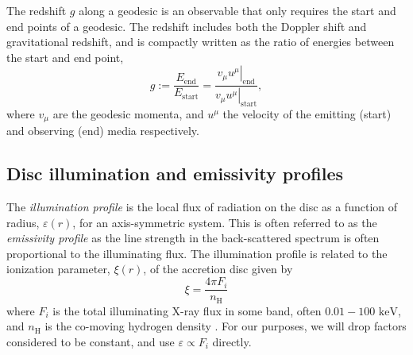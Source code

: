 \documentclass[fleqn,usenatbib]{mnras}
\begin{document}
The redshift $g$ along a geodesic is an observable that only requires the start
and end points of a geodesic. The redshift includes both the Doppler shift and
gravitational redshift, and is compactly written as the ratio of energies
between the start and end point,
\begin{equation}
\label{eq:redshift}
g := \frac{E_\text{end}}{E_\text{start}} = \frac{\left. v_\mu u^\mu
\right\rvert_\text{end}}{\left. v_\mu u^\mu \right\rvert_{\text{start}}},
\end{equation}
where $v_\mu$ are the geodesic momenta, and $u^\mu$ the velocity of the emitting
(start) and observing (end) media respectively.



\subsection{Disc illumination and emissivity profiles}
\label{sec:emissivity-profiles}

The \emph{illumination profile} is the local flux of radiation on the disc as a function of radius, $\varepsilon(r)$, for an axis-symmetric system. This is often referred to as the \emph{emissivity profile} as the line strength in the back-scattered spectrum is often proportional to the illuminating flux.
The illumination profile is related to the ionization parameter, $\xi(r)$, of the accretion disc \citep{laor_line_1991,ross_reflection_1993, wilkins_understanding_2012}
given by
\begin{equation}
    \xi = \frac{4 \pi F_i}{n_\text{H}}
\end{equation}
where $F_i$ is the total illuminating X-ray flux in some band, often $0.01 - 100 \text{ keV}$, and $n_\text{H}$ is the co-moving hydrogen density \citep{ross_effects_1993}.
For our purposes, we will drop factors considered to be constant, and use
$\varepsilon \propto F_i$ directly.
\end{document}
